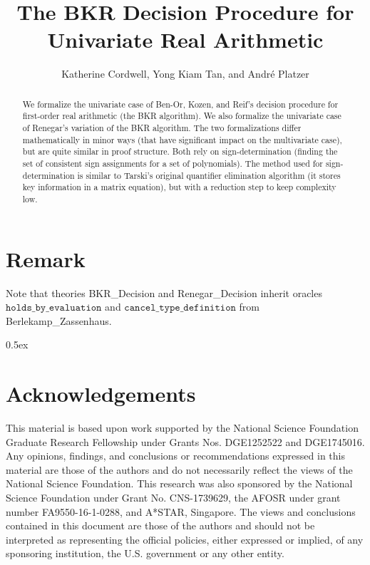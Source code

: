 \documentclass[11pt,a4paper]{article}
\begin{document}
\title{The BKR Decision Procedure for Univariate Real Arithmetic}
\author{Katherine Cordwell, Yong Kiam Tan, and Andr\'e Platzer}
\maketitle

\begin{abstract}
We formalize the univariate case of Ben-Or, Kozen, and Reif's decision procedure for first-order real arithmetic \cite{DBLP:journals/jcss/Ben-OrKR86} (the BKR algorithm). We also formalize the univariate case of Renegar's variation \cite{DBLP:journals/jsc/Renegar92b} of the BKR algorithm. The two formalizations differ mathematically in minor ways (that have significant impact on the multivariate case), but are quite similar in proof structure.  Both rely on sign-determination (finding the set of consistent sign assignments for a set of polynomials).  The method used for sign-determination is similar to Tarski's original quantifier elimination algorithm (it stores key information in a matrix equation), but with a reduction step to keep complexity low.
\end{abstract}

\section*{Remark} Note that theories BKR\_Decision and Renegar\_Decision inherit oracles  $\mathtt{holds\_by\_evaluation}$ and  $\mathtt{cancel\_type\_definition}$ from  Berlekamp\_Zassenhaus.

\tableofcontents

\parindent 0pt\parskip 0.5ex



\section*{Acknowledgements}
This material is based upon work supported by the National Science Foundation Graduate Research Fellowship under Grants Nos. DGE1252522 and DGE1745016.
Any opinions, findings, and conclusions or recommendations expressed in this material are those of the authors and do not necessarily reflect the views of the National Science Foundation.
This research was also sponsored by the National Science Foundation under Grant No. CNS-1739629, the AFOSR under grant number FA9550-16-1-0288, and A*STAR, Singapore.
The views and conclusions contained in this document are those of the authors and should not be interpreted as representing the official policies, either expressed or implied, of any sponsoring institution, the U.S. government or any other entity.




\end{document}
